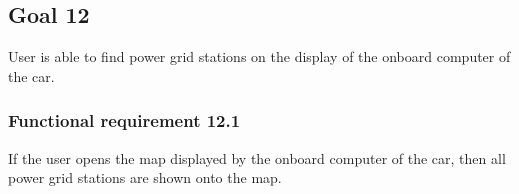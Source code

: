 \subsection{Goal 12}
User is able to find power grid stations on the display of the onboard computer of the car.

\setcounter{secnumdepth}{3}
\subsubsection{Functional requirement 12.1}
If the user opens the map displayed by the onboard computer of the car, then all power grid stations are shown onto the map.